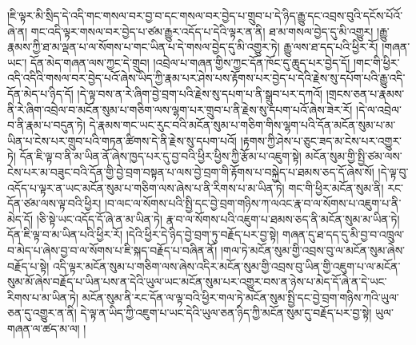 །ཇི་ལྟར་མི་སྲིད་དེ་འདི་གང་གསལ་བར་བྱ་བ་དང་གསལ་བར་བྱེད་པ་གྲུབ་པ་དེ་ཉིད་རྒྱུ་དང་འབྲས་བུའི་དངོས་པོའོ་ཞེ་ན། གང་འདི་ལྟར་གསལ་བར་བྱེད་པ་ཙམ་རྒྱུར་འདོད་པ་དེའི་ལྟར་ན་ནི། ཐ་མ་གསལ་བྱེད་དུ་མི་འགྱུར། །རྒྱུ་རྣམས་ཀྱི་ཐ་མ་ལྡན་པ་ལ་སོགས་པ་གང་ཡིན་པ་དེ་གསལ་བྱེད་དུ་མི་འགྱུར་ཏེ། རྒྱུ་ལས་ཐ་དད་པའི་ཕྱིར་རོ། །གཞན་ཡང་། དོན་མེད་གཞན་ལས་ཀྱང་དེ་གྲུབ། །འབྲེལ་པ་གཞན་གྱིས་ཀྱང་དོན་ཁོང་དུ་ཆུད་པར་བྱེད་དོ། །གང་གི་ཕྱིར་འདི་འདིའི་གསལ་བར་བྱེད་པའོ་ཞེས་ཡིད་ཀྱི་རྣམ་པར་ཤེས་པས་རྟོགས་པར་བྱེད་པ་དེའི་རྗེས་སུ་དཔོག་པའི་རྒྱུ་འདི་དོན་མེད་པ་ཉིད་དོ། །དེ་ལྟ་བས་ན་རེ་ཞིག་བྱེ་བྲག་པའི་རྗེས་སུ་དཔག་པ་ནི་སྒྲུབ་པར་དཀའོ། །གྲངས་ཅན་པ་རྣམས་ནི་རེ་ཞིག་འབྲེལ་བ་མངོན་སུམ་པ་གཅིག་ལས་ལྷག་པར་གྲུབ་པ་ནི་རྗེས་སུ་དཔག་པའོ་ཞེས་ཟེར་རོ། །དེ་ལ་འབྲེལ་བ་ནི་རྣམ་པ་བདུན་ཏེ། དེ་རྣམས་གང་ཡང་རུང་བའི་མངོན་སུམ་པ་གཅིག་གིས་ལྷག་པའི་དོན་མངོན་སུམ་པ་མ་ཡིན་པ་ངེས་པར་གྲུབ་པའི་གཏན་ཚིགས་དེ་ནི་རྗེས་སུ་དཔག་པའོ། །རྟགས་ཀྱི་ཤེས་པ་ཅུང་ཟད་མ་ངེས་པར་འགྱུར་ཏེ། དོན་ཇི་ལྟ་བ་ནི་མ་ཡིན་ནོ་ཞེས་ཁྱད་པར་དུ་བྱ་བའི་ཕྱིར་ཕྱིས་ཀྱི་རྩོམ་པ་འཇུག་སྟེ། མངོན་སུམ་གྱི་སྤྱི་ཙམ་ལས་ངེས་པར་མ་བཟུང་བའི་དོན་གྱི་བྱེ་བྲག་བསྟན་པ་ལས་བྱེ་བྲག་གི་རྟོགས་པ་བསྐྱེད་པ་ཐམས་ཅད་དོ་ཞེས་སོ། །དེ་ལྟ་བུ་འདོད་པ་ལྟར་ན་ཡང་མངོན་སུམ་པ་གཅིག་ལས་ཞེས་པ་ནི་རིགས་པ་མ་ཡིན་ཏེ། གང་གི་ཕྱིར་མངོན་སུམ་ནི། རང་དོན་ཙམ་ལས་ལྟ་བའི་ཕྱིར། །བ་ལང་ལ་སོགས་པའི་སྤྱི་དང་བྱེ་བྲག་གཉིས་ཀ་ལའང་རྣ་བ་ལ་སོགས་པ་འཇུག་པ་ནི་མེད་དོ། །ཅི་སྟེ་ཡང་འདོད་དོ་ཞེ་ན་མ་ཡིན་ཏེ། རྣ་བ་ལ་སོགས་པའི་འཇུག་པ་ཐམས་ཅད་ནི་མངོན་སུམ་མ་ཡིན་ཏེ། དོན་ཇི་ལྟ་བ་མ་ཡིན་པའི་ཕྱིར་རོ། །དེའི་ཕྱིར་དེ་ཉིད་བྱེ་བྲག་ཏུ་བརྗོད་པར་བྱ་སྟེ། གཞན་དུ་ཐ་དད་དུ་མི་བྱ་བ་འཁྲུལ་བ་མེད་པ་ཞེས་བྱ་བ་ལ་སོགས་པ་ཇི་སྐད་བརྗོད་པ་བཞིན་ནོ། །གལ་ཏེ་མངོན་སུམ་གྱི་འབྲས་བུ་ལ་མངོན་སུམ་ཞེས་བརྗོད་པ་སྟེ། འདི་ལྟར་མངོན་སུམ་པ་གཅིག་ལས་ཞེས་འདིར་མངོན་སུམ་གྱི་འབྲས་བུ་ཡིན་གྱི་འཇུག་པ་ལ་མངོན་སུམ་མོ་ཞེས་བརྗོད་པ་ཡིན་པས་ན་དེའི་ཡུལ་ཡང་མངོན་སུམ་པར་འགྱུར་བས་ན་ཉེས་པ་མེད་དོ་ཞེ་ན་དེ་ཡང་རིགས་པ་མ་ཡིན་ཏེ། མངོན་སུམ་ནི་རང་དོན་ལ་ལྟ་བའི་ཕྱིར་གལ་ཏེ་མངོན་སུམ་སྤྱི་དང་བྱེ་བྲག་གཉིས་ཀའི་ཡུལ་ཅན་དུ་འགྱུར་ན་ནི། དེ་ལྟ་ན་ཡིད་ཀྱི་འཇུག་པ་ཡང་དེའི་ཡུལ་ཅན་ཉིད་ཀྱི་མངོན་སུམ་དུ་བརྗོད་པར་བྱ་སྟེ། ཡུལ་གཞན་ལ་ཚད་མ་ལ། །
